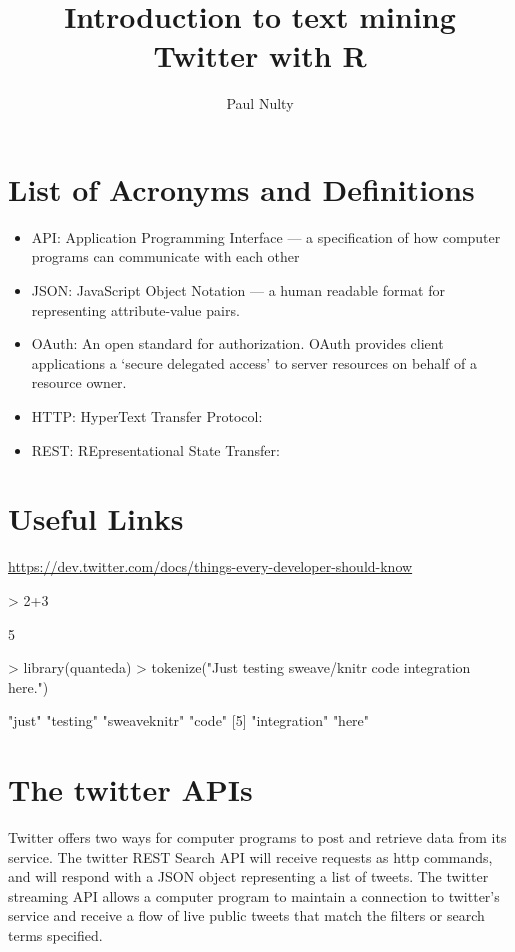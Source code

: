 \documentclass{article}
\title{Introduction to text mining Twitter with R}
\author{Paul Nulty}
\begin{document}

\maketitle
\clearpage

\section*{List of Acronyms and Definitions}
\begin{itemize}
  \item API: Application Programming Interface --- a specification of how computer programs can communicate with each other
  \item JSON: JavaScript Object Notation --- a human readable format for representing attribute-value pairs.
  \item OAuth: An open standard for authorization. OAuth provides client applications a `secure delegated access' to server resources on behalf of a resource owner.
  \item HTTP: HyperText Transfer Protocol: 
  \item REST: REpresentational State Transfer:
\end{itemize}

\section*{Useful Links}
\url{https://dev.twitter.com/docs/things-every-developer-should-know}

\clearpage


\begin{Schunk}
\begin{Sinput}
> 2+3
\end{Sinput}
\begin{Soutput}
[1] 5
\end{Soutput}
\begin{Sinput}
> library(quanteda)
> tokenize("Just testing sweave/knitr code integration here.")
\end{Sinput}
\begin{Soutput}
[1] "just"        "testing"     "sweaveknitr" "code"       
[5] "integration" "here"       
\end{Soutput}
\end{Schunk}


\section*{The twitter APIs}
Twitter offers two ways for computer programs to post and retrieve data from its service. The twitter REST Search API will receive requests as http commands, and will respond with a JSON object representing a list of tweets. The twitter streaming API allows a computer program to maintain a connection to twitter's service and receive a flow of live public tweets that match the filters or search terms specified.
\end{document}
